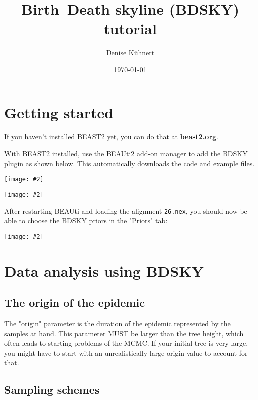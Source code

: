 \documentclass[11pt]{article}
\title{Birth--Death skyline (BDSKY) tutorial}
\author{Denise K\"uhnert}
\date{\today}                                           %
\newcommand{\includeimage}[2][]{%
\texttt{[image: \#2]}
}
\begin{document}
\maketitle
\tableofcontents

\pagebreak

\section{Getting started}

If you haven't installed BEAST2 yet, you can do that at \href{http://beast2.org}{\bf beast2.org}.

With BEAST2 installed, use the BEAUti2 add-on manager to add the BDSKY plugin as shown below. This automatically downloads the code and example files.

\begin{center}
\includeimage[width=.5\linewidth]{figures/BEAUTI_addonmanager}
\end{center}
\begin{center}
\includeimage[width=.5\linewidth]{figures/BEAUTI_BDSKY1}
\end{center}

After restarting BEAUti and loading the alignment \texttt{26.nex}, you should now be able to choose the BDSKY priors in the "Priors" tab: 
\begin{center}
\includeimage[width=.75\linewidth]{figures/BEAUTI_BDSKY2}
\end{center}


\pagebreak
\section{Data analysis using BDSKY}


\subsection{The origin of the epidemic}

The "origin" parameter is the duration of the epidemic represented by the samples at hand. This parameter MUST be larger than the tree height, which often leads to starting problems of the MCMC. If your initial tree is very large, you might have to start with an unrealistically large origin value to account for that. 



\subsection{Sampling schemes}
\end{document}
